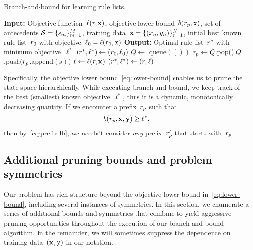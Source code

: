 \begin{algorithm}[t!]
\caption{Branch-and-bound for learning rule lists.}
\label{alg:branch-and-bound}
\begin{algorithmic}
\normalsize
\State \textbf{Input:} Objective function~$\ell({r}, \mathbf{x})$, objective lower bound~${b({r_p}, \mathbf{x})}$,
set of antecedents ${{\mathcal S} = \{s_m\}_{m=1}^M}$, training data~$\mathbf{x} = {\{(x_n, y_n)\}_{n=1}^N}$,
initial best known rule list~${r}_0$ with objective~${\ell_0 = \ell({r}_0, \mathbf{x})}$
\State \textbf{Output:} Optimal rule list~${r}^*$ with minimum objective~$\ell^*$
\State $({r}^*, \ell^*) \gets ({r}_0, \ell_0)$ 
\State $Q \gets $ queue$(())$ 
 
	\State ${r_p} \gets Q$.pop() 
	 
         
            \State $Q$.push$({r_p}$.append$(s))$ 
        \EndFor
        \State $\ell \gets \ell({r}, \mathbf{x})$ 
        \If {$\ell < \ell^*$}
            \State $({r}^*, \ell^*) \gets ({r}, \ell)$ 
        \EndIf
    \EndIf
\EndWhile
\end{algorithmic}
\end{algorithm}

Specifically, the objective lower bound~\eqref{eq:lower-bound} enables us to prune
the state space hierarchically.
%
While executing branch-and-bound, we keep track of the best (smallest) known
objective~$\ell^*$, thus it is a dynamic, monotonically decreasing quantity.
%
If we encounter a prefix~${r_p}$ such that
\begin{align}
b(\Prefix, \x, \y) \ge \ell^*,
\end{align}
then by~\eqref{eq:prefix-lb}, we needn't consider \emph{any} prefix~${r'_p}$
that starts with~${r_p}$.

\subsection{Additional pruning bounds and problem symmetries}

Our problem has rich structure beyond the objective lower bound in~\eqref{eq:lower-bound},
including several instances of symmetries.
%
In this section, we enumerate a series of additional bounds and symmetries that
combine to yield aggressive pruning opportunities throughout the execution of
our branch-and-bound algorithm.
%
In the remainder, we will sometimes suppress the dependence on
training data~$(\mathbf{x}, \mathbf{y})$ in our notation.

